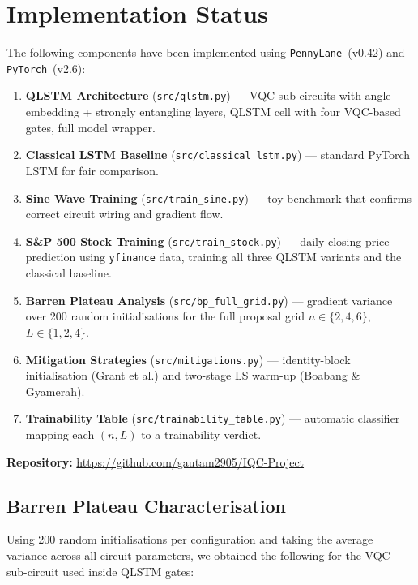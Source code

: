 \documentclass[10pt,twocolumn]{article}
\begin{document}
\section{Implementation Status}

The following components have been implemented using \texttt{PennyLane}~(v0.42) and \texttt{PyTorch}~(v2.6):

\begin{enumerate}
  \item \textbf{QLSTM Architecture} (\texttt{src/qlstm.py}) — VQC sub-circuits with angle embedding + strongly entangling layers, QLSTM cell with four VQC-based gates, full model wrapper.
  \item \textbf{Classical LSTM Baseline} (\texttt{src/classical\_lstm.py}) — standard PyTorch LSTM for fair comparison.
  \item \textbf{Sine Wave Training} (\texttt{src/train\_sine.py}) — toy benchmark that confirms correct circuit wiring and gradient flow.
  \item \textbf{S\&P 500 Stock Training} (\texttt{src/train\_stock.py}) — daily closing-price prediction using \texttt{yfinance} data, training all three QLSTM variants and the classical baseline.
  \item \textbf{Barren Plateau Analysis} (\texttt{src/bp\_full\_grid.py}) — gradient variance over 200 random initialisations for the full proposal grid $n \in \{2, 4, 6\}$, $L \in \{1, 2, 4\}$.
  \item \textbf{Mitigation Strategies} (\texttt{src/mitigations.py}) — identity-block initialisation (Grant et al.) and two-stage LS warm-up (Boabang \& Gyamerah).
  \item \textbf{Trainability Table} (\texttt{src/trainability\_table.py}) — automatic classifier mapping each $(n, L)$ to a trainability verdict.
\end{enumerate}

\smallskip
\textbf{Repository:} \url{https://github.com/gautam2905/IQC-Project}

\subsection*{Barren Plateau Characterisation}

Using 200 random initialisations per configuration and taking the average variance across all circuit parameters, we obtained the following for the VQC sub-circuit used inside QLSTM gates:
\end{document}

